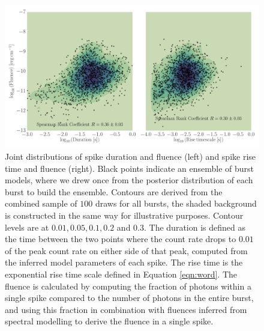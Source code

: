 \documentclass[12pt]{emulateapj}
\begin{document}
\begin{figure}[htbp]
\begin{center}
\includegraphics[width=\textwidth]{f9.pdf}%
\caption{Joint distributions of spike duration and fluence (left) and spike rise time and fluence (right). Black points indicate an ensemble of burst models, where we drew once
from the posterior distribution of each burst to build the ensemble. Contours are derived from the combined sample of $100$ draws for all bursts, the shaded background is constructed in
the same way for illustrative purposes. Contour levels are at $0.01, 0.05, 0.1, 0.2$ and $0.3$.
The duration is defined as the time between the two points where
the count rate drops to $0.01$ of the peak count rate on either side of that peak, computed from the inferred model parameters of each spike. The rise time is the exponential
rise time scale defined in Equation \ref{eqn:word}. The fluence is calculated by computing the fraction of photons within a single spike compared to the number of photons in the
entire burst, and using
this fraction in combination with fluences inferred from spectral modelling \citep{vanderhorst2012,vonkienlin2012} to derive the fluence in a single spike.}
\label{fig:correlations}
\end{center}
\end{figure}
\end{document}
